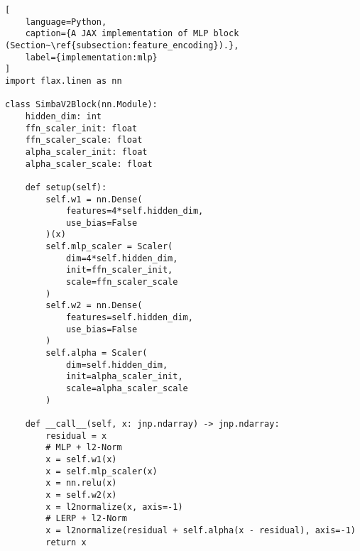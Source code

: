 \begin{lstlisting}[
    language=Python,
    caption={A JAX implementation of MLP block (Section~\ref{subsection:feature_encoding}).},
    label={implementation:mlp}
]
import flax.linen as nn

class SimbaV2Block(nn.Module):
    hidden_dim: int
    ffn_scaler_init: float
    ffn_scaler_scale: float
    alpha_scaler_init: float
    alpha_scaler_scale: float

    def setup(self):
        self.w1 = nn.Dense(
            features=4*self.hidden_dim,
            use_bias=False
        )(x)
        self.mlp_scaler = Scaler(
            dim=4*self.hidden_dim,
            init=ffn_scaler_init,
            scale=ffn_scaler_scale
        )
        self.w2 = nn.Dense(
            features=self.hidden_dim,
            use_bias=False
        )
        self.alpha = Scaler(
            dim=self.hidden_dim,
            init=alpha_scaler_init,
            scale=alpha_scaler_scale
        )

    def __call__(self, x: jnp.ndarray) -> jnp.ndarray:
        residual = x
        # MLP + l2-Norm
        x = self.w1(x)
        x = self.mlp_scaler(x)
        x = nn.relu(x)
        x = self.w2(x)
        x = l2normalize(x, axis=-1)
        # LERP + l2-Norm
        x = l2normalize(residual + self.alpha(x - residual), axis=-1)
        return x
\end{lstlisting}